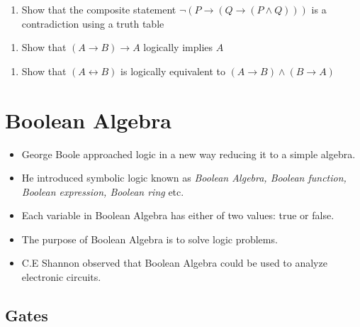 \documentclass[]{book}
\providecommand{\tightlist}{%
  \setlength{\itemsep}{0pt}\setlength{\parskip}{0pt}}
\begin{document}
\begin{enumerate}
\def\labelenumi{\arabic{enumi}.}
\setcounter{enumi}{2}
\tightlist
\item
  Show that the composite statement \(\lnot (P \rightarrow( Q \rightarrow (P \land Q)))\) is a contradiction using a truth table
\end{enumerate}

\begin{enumerate}
\def\labelenumi{\arabic{enumi}.}
\setcounter{enumi}{3}
\tightlist
\item
  Show that \((A \rightarrow B) \rightarrow A\)
  logically implies \(A\)
\end{enumerate}

\begin{enumerate}
\def\labelenumi{\arabic{enumi}.}
\setcounter{enumi}{4}
\tightlist
\item
  Show that \((A \leftrightarrow B)\) is
  logically equivalent to \((A \rightarrow B) \land (B \rightarrow A)\)
\end{enumerate}

\hypertarget{boolean-algebra}{%
\chapter{Boolean Algebra}\label{boolean-algebra}}


\begin{itemize}
\tightlist
\item
  George Boole approached logic in a new way reducing it to a simple algebra.
\item
  He introduced symbolic logic known as \emph{Boolean Algebra, Boolean function, Boolean expression, Boolean ring} etc.
\item
  Each variable in Boolean Algebra has either of two values: true or false.
\item
  The purpose of Boolean Algebra is to solve logic problems.
\item
  C.E Shannon observed that Boolean Algebra could be used to analyze electronic circuits.
\end{itemize}

\hypertarget{gates}{%
\section{Gates}\label{gates}}
\end{document}
